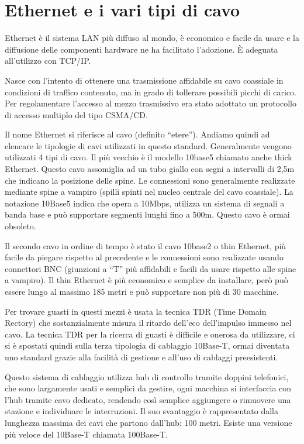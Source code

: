 \section{Ethernet e i vari tipi di cavo}

Ethernet è il sistema LAN più diffuso al mondo, è economico e facile da usare e la diffusione delle componenti hardware ne ha facilitato l’adozione. È adeguata all’utilizzo con TCP/IP.

Nasce con l’intento di ottenere una trasmissione affidabile su cavo coassiale in condizioni di traffico contenuto, ma in grado di tollerare possibili picchi di carico. Per regolamentare l’accesso al mezzo trasmissivo era stato adottato un protocollo di accesso multiplo del tipo CSMA/CD.

Il nome Ethernet si riferisce al cavo (definito “etere”). Andiamo quindi ad elencare le tipologie di cavi utilizzati in questo standard.
Generalmente vengono utilizzati 4 tipi di cavo. Il più vecchio è il modello 10base5 chiamato anche thick Ethernet. Questo cavo assomiglia ad un tubo giallo con segni a intervalli di 2,5m che indicano la posizione delle spine.
Le connessioni sono generalmente realizzate mediante spine a vampiro (spilli spinti nel nucleo centrale del cavo coassiale). 
La notazione 10Base5 indica che opera a 10Mbps, utilizza un sistema di segnali a banda base e può supportare segmenti lunghi fino a 500m. Questo cavo è ormai obsoleto.

Il secondo cavo in ordine di tempo è stato il cavo 10base2 o thin Ethernet, più facile da piegare rispetto al precedente e le connessioni sono realizzate usando connettori BNC (giunzioni a “T” più affidabili e facili da usare rispetto alle spine a vampiro). Il thin Ethernet è più economico e semplice da installare, però può essere lungo al massimo 185 metri e può supportare non più di 30 macchine.

Per trovare guasti in questi mezzi è usata la tecnica TDR (Time Domain Rectory) che sostanzialmente misura il ritardo dell'eco dell'impulso immesso nel cavo.
La tecnica TDR per la ricerca di guasti è difficile e onerosa da utilizzare, ci si è spostati quindi sulla terza tipologia di cablaggio 10Base-T, ormai diventata uno standard grazie alla facilità di gestione e all’uso di cablaggi preesistenti.

Questo sistema di cablaggio utilizza hub di controllo tramite doppini telefonici, che sono largamente usati e semplici da gestire, ogni macchina si interfaccia con l’hub tramite cavo dedicato, rendendo così semplice aggiungere o rimuovere una stazione e individuare le interruzioni. Il suo svantaggio è rappresentato dalla lunghezza massima dei cavi che partono dall’hub: 100 metri. Esiste una versione più veloce del 10Base-T chiamata 100Base-T.

